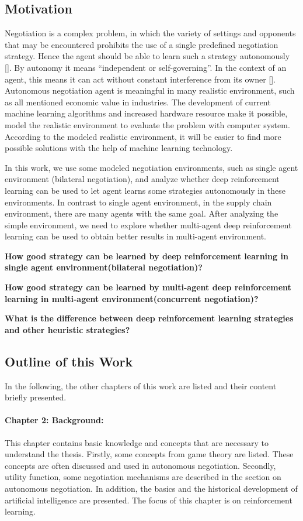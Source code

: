 \subsection{Motivation}
Negotiation is a complex problem, in which the variety of settings and opponents that may be encountered prohibits the use of a single predefined negotiation strategy. Hence the agent should be able to learn such a strategy autonomously []. By autonomy it means “independent or self-governing”. In the context of an agent, this means it can act without constant interference from its owner []. Autonomous negotiation agent is meaningful in many realistic environment, such as all mentioned economic value in industries. The development of current machine learning algorithms and increased hardware resource make it possible, model the realistic environment to evaluate the problem with computer system. According to the modeled realistic environment, it will be easier to find more possible solutions with the help of machine learning technology.

In this work, we use some modeled negotiation environments, such as single agent environment (bilateral negotiation), and analyze whether deep reinforcement learning can be used to let agent learns some strategies autonomously in these environments. In contrast to single agent environment, in the supply chain environment, there are many agents with the same goal. After analyzing the simple environment, we need to explore whether multi-agent deep reinforcement learning can be used to obtain better results in multi-agent environment.

\textbf{How good strategy can be learned by deep reinforcement learning in single agent environment(bilateral negotiation)?}

\textbf{How good strategy can be learned by multi-agent deep reinforcement learning in multi-agent environment(concurrent negotiation)?}

\textbf{What is the difference between deep reinforcement learning strategies and other heuristic strategies?}

\subsection{Outline of this Work}
In the following, the other chapters of this work are listed and their content briefly presented.

\paragraph{Chapter 2: Background:}
This chapter contains basic knowledge and concepts that are necessary to understand the thesis. Firstly, some concepts from game theory are listed. These concepts are often discussed and used in autonomous negotiation. Secondly, utility function, some negotiation mechanisms are described in the section on autonomous negotiation. In addition, the basics and the historical development of artificial intelligence are presented. The focus of this chapter is on reinforcement learning.

